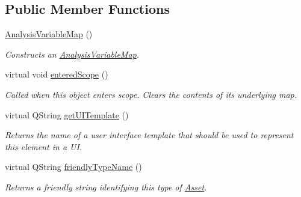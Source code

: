 \subsection*{Public Member Functions}
\begin{DoxyCompactItemize}
\item 
\hyperlink{class_picto_1_1_analysis_variable_map_a4238b5892dc8efa776b880785a7ef6d8}{Analysis\-Variable\-Map} ()
\begin{DoxyCompactList}\small\item\em Constructs an \hyperlink{class_picto_1_1_analysis_variable_map}{Analysis\-Variable\-Map}. \end{DoxyCompactList}\item 
\hypertarget{class_picto_1_1_analysis_variable_map_a7bbe77eef94581929441e7efe5fb6034}{virtual void \hyperlink{class_picto_1_1_analysis_variable_map_a7bbe77eef94581929441e7efe5fb6034}{entered\-Scope} ()}\label{class_picto_1_1_analysis_variable_map_a7bbe77eef94581929441e7efe5fb6034}

\begin{DoxyCompactList}\small\item\em Called when this object enters scope. Clears the contents of its underlying map. \end{DoxyCompactList}\item 
\hypertarget{class_picto_1_1_analysis_variable_map_ae295435802cfabcf6c5c78464d3775b7}{virtual Q\-String \hyperlink{class_picto_1_1_analysis_variable_map_ae295435802cfabcf6c5c78464d3775b7}{get\-U\-I\-Template} ()}\label{class_picto_1_1_analysis_variable_map_ae295435802cfabcf6c5c78464d3775b7}

\begin{DoxyCompactList}\small\item\em Returns the name of a user interface template that should be used to represent this element in a U\-I. \end{DoxyCompactList}\item 
virtual Q\-String \hyperlink{class_picto_1_1_analysis_variable_map_a885cd581e660bf703e1130bbb1df50d7}{friendly\-Type\-Name} ()
\begin{DoxyCompactList}\small\item\em Returns a friendly string identifying this type of \hyperlink{class_picto_1_1_asset}{Asset}. \end{DoxyCompactList}\end{DoxyCompactItemize}
